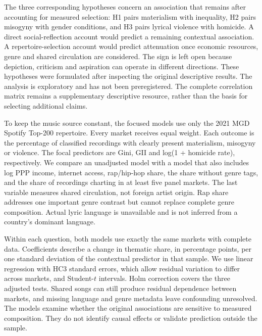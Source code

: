 \documentclass[10pt,a4paper,twocolumn]{article}
\begin{document}
The three corresponding hypotheses concern an association that remains after accounting for measured selection: H1 pairs materialism with inequality, H2 pairs misogyny with gender conditions, and H3 pairs lyrical violence with homicide. A direct social-reflection account would predict a remaining contextual association. A repertoire-selection account would predict attenuation once economic resources, genre and shared circulation are considered. The sign is left open because depiction, criticism and aspiration can operate in different directions. These hypotheses were formulated after inspecting the original descriptive results. The analysis is exploratory and has not been preregistered. The complete correlation matrix remains a supplementary descriptive resource, rather than the basis for selecting additional claims.

To keep the music source constant, the focused models use only the 2021 MGD Spotify Top-200 repertoire. Every market receives equal weight. Each outcome is the percentage of classified recordings with clearly present materialism, misogyny or violence. The focal predictors are Gini, GII and log(1 + homicide rate), respectively. We compare an unadjusted model with a model that also includes log PPP income, internet access, rap/hip-hop share, the share without genre tags, and the share of recordings charting in at least five panel markets. The last variable measures shared circulation, not foreign artist origin. Rap share addresses one important genre contrast but cannot replace complete genre composition. Actual lyric language is unavailable and is not inferred from a country's dominant language.

Within each question, both models use exactly the same markets with complete data. Coefficients describe a change in thematic share, in percentage points, per one standard deviation of the contextual predictor in that sample. We use linear regression with HC3 standard errors, which allow residual variation to differ across markets, and Student-$t$ intervals. Holm correction covers the three adjusted tests. Shared songs can still produce residual dependence between markets, and missing language and genre metadata leave confounding unresolved. The models examine whether the original associations are sensitive to measured composition. They do not identify causal effects or validate prediction outside the sample.
\end{document}
